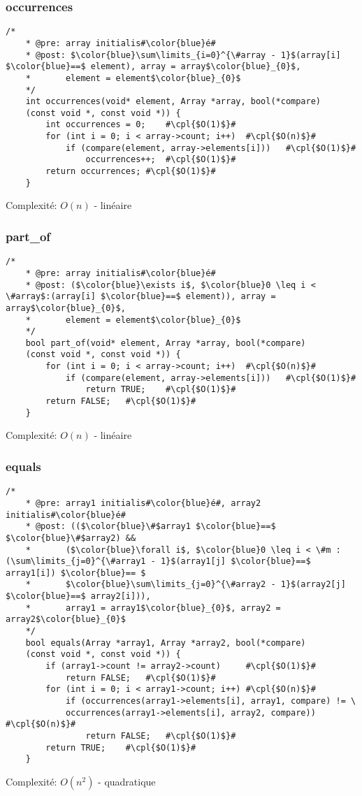 \documentclass[a4paper, 11pt, oneside]{article}
\begin{document}
	\subsubsection{occurrences}
	\begin{lstlisting}[mathescape]
	/*
	* @pre: array initialis#\color{blue}é#
	* @post: $\color{blue}\sum\limits_{i=0}^{\#array - 1}$(array[i] $\color{blue}==$ element), array = array$\color{blue}_{0}$,
	*		element = element$\color{blue}_{0}$
	*/
	int occurrences(void* element, Array *array, bool(*compare)
	(const void *, const void *)) {
		int occurrences = 0;	#\cpl{$O(1)$}#
		for (int i = 0; i < array->count; i++)	#\cpl{$O(n)$}#
			if (compare(element, array->elements[i]))	#\cpl{$O(1)$}#
				occurrences++;	#\cpl{$O(1)$}#
		return occurrences;	#\cpl{$O(1)$}#
	}
	\end{lstlisting}
	Complexité: $O(n)$ - linéaire
	
	\subsubsection{part\_of}
	\begin{lstlisting}[mathescape]
	/*
	* @pre: array initialis#\color{blue}é#
	* @post: ($\color{blue}\exists i$, $\color{blue}0 \leq i < \#array$:(array[i] $\color{blue}==$ element)), array = array$\color{blue}_{0}$,
	*		element = element$\color{blue}_{0}$
	*/
	bool part_of(void* element, Array *array, bool(*compare)    
	(const void *, const void *)) {
		for (int i = 0; i < array->count; i++)	#\cpl{$O(n)$}#
			if (compare(element, array->elements[i]))	#\cpl{$O(1)$}#
				return TRUE;	#\cpl{$O(1)$}#
		return FALSE;	#\cpl{$O(1)$}#
	}
	\end{lstlisting}
	Complexité: $O(n)$ - linéaire
	
	\clearpage
	\subsubsection{equals}
	\begin{lstlisting}[mathescape]
	/*
	* @pre: array1 initialis#\color{blue}é#, array2 initialis#\color{blue}é#
	* @post: (($\color{blue}\#$array1 $\color{blue}==$ $\color{blue}\#$array2) && 
	*		($\color{blue}\forall i$, $\color{blue}0 \leq i < \#m : (\sum\limits_{j=0}^{\#array1 - 1}$(array1[j] $\color{blue}==$ array1[i]) $\color{blue}== $
	*		$\color{blue}\sum\limits_{j=0}^{\#array2 - 1}$(array2[j] $\color{blue}==$ array2[i])),
	*		array1 = array1$\color{blue}_{0}$, array2 = array2$\color{blue}_{0}$
	*/
	bool equals(Array *array1, Array *array2, bool(*compare)    
	(const void *, const void *)) {
		if (array1->count != array2->count)		#\cpl{$O(1)$}#
			return FALSE;	#\cpl{$O(1)$}#
		for (int i = 0; i < array1->count; i++)	#\cpl{$O(n)$}#
			if (occurrences(array1->elements[i], array1, compare) != \
			occurrences(array1->elements[i], array2, compare))	#\cpl{$O(n)$}#
				return FALSE;	#\cpl{$O(1)$}#
		return TRUE;	#\cpl{$O(1)$}#
	}
	\end{lstlisting}
	Complexité: $O(n^2)$ - quadratique
	
\end{document}

